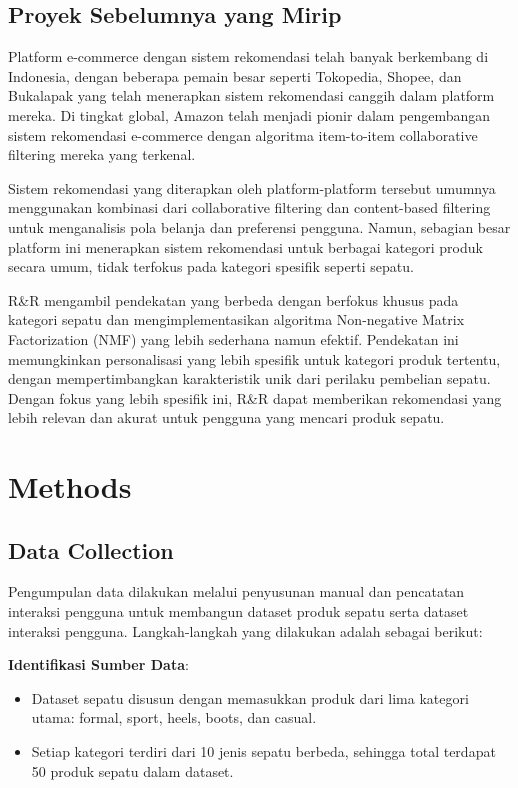 \documentclass[journal,article,submit,pdftex,moreauthors]{Definitions/mdpi}
\begin{document}
\subsection{Proyek Sebelumnya yang Mirip}
Platform e-commerce dengan sistem rekomendasi telah banyak berkembang di Indonesia, dengan beberapa pemain besar seperti Tokopedia, Shopee, dan Bukalapak yang telah menerapkan sistem rekomendasi canggih dalam platform mereka. Di tingkat global, Amazon telah menjadi pionir dalam pengembangan sistem rekomendasi e-commerce dengan algoritma item-to-item collaborative filtering mereka yang terkenal.

Sistem rekomendasi yang diterapkan oleh platform-platform tersebut umumnya menggunakan kombinasi dari collaborative filtering dan content-based filtering untuk menganalisis pola belanja dan preferensi pengguna. Namun, sebagian besar platform ini menerapkan sistem rekomendasi untuk berbagai kategori produk secara umum, tidak terfokus pada kategori spesifik seperti sepatu.

R\&R mengambil pendekatan yang berbeda dengan berfokus khusus pada kategori sepatu dan mengimplementasikan algoritma Non-negative Matrix Factorization (NMF) yang lebih sederhana namun efektif. Pendekatan ini memungkinkan personalisasi yang lebih spesifik untuk kategori produk tertentu, dengan mempertimbangkan karakteristik unik dari perilaku pembelian sepatu. Dengan fokus yang lebih spesifik ini, R\&R dapat memberikan rekomendasi yang lebih relevan dan akurat untuk pengguna yang mencari produk sepatu.



\section{Methods}
\subsection{Data Collection}

Pengumpulan data dilakukan melalui penyusunan manual dan pencatatan interaksi pengguna untuk membangun dataset produk sepatu serta dataset interaksi pengguna. Langkah-langkah yang dilakukan adalah sebagai berikut:


    \item \textbf{Identifikasi Sumber Data}:
    \begin{itemize}
        \item Dataset sepatu disusun dengan memasukkan produk dari lima kategori utama: formal, sport, heels, boots, dan casual.
        \item Setiap kategori terdiri dari 10 jenis sepatu berbeda, sehingga total terdapat 50 produk sepatu dalam dataset.
    \end{itemize}
    
\end{document}
